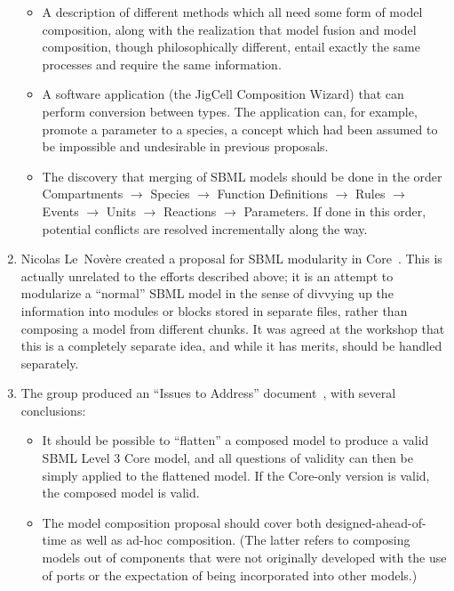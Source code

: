 \begin{enumerate}
  \begin{itemize}

  \item A description of different methods which all need some form of
    model composition, along with the realization that model fusion
    and model composition, though philosophically different, entail
    exactly the same processes and require the same information.

  \item A software application (the JigCell Composition Wizard) that
    can perform conversion between types.  The application can, for
    example, promote a parameter to a species, a concept which had
    been assumed to be impossible and undesirable in previous
    proposals.  

  \item The discovery that merging of SBML models should be done in
    the order Compartments $\rightarrow$ Species  $\rightarrow$
    Function Definitions  $\rightarrow$ Rules  $\rightarrow$ Events
    $\rightarrow$ Units  $\rightarrow$ Reactions  $\rightarrow$
    Parameters.  If done in this order, potential conflicts are
    resolved incrementally along the way.

  \end{itemize}

\item Nicolas Le~Nov\`{e}re created a proposal for SBML modularity in
  Core~\citep{lenov:2007}.  This is actually unrelated to the efforts
  described above; it is an attempt to modularize a ``normal'' SBML
  model in the sense of divvying up the information into modules or
  blocks stored in separate files, rather than composing a model from
  different chunks.  It was agreed at the workshop that this is a
  completely separate idea, and while it has merits, should be handled
  separately.

\item The group produced an ``Issues to Address''
  document~\citep{various:2007}, with several conclusions:

  \begin{itemize}

  \item It should be possible to ``flatten'' a composed model to
    produce a valid SBML Level 3 Core model, and all questions of
    validity can then be simply applied to the flattened model.  If
    the Core-only version is valid, the composed model is valid.

  \item The model composition proposal should cover both
    designed-ahead-of-time as well as ad-hoc composition. (The latter
    refers to composing models out of components that were not
    originally developed with the use of ports or the expectation of
    being incorporated into other models.)


\end{itemize}
\end{enumerate}
